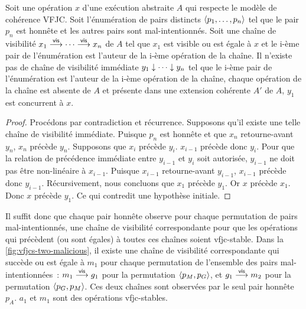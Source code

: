 \begin{proposition}
Soit une opération $x$ d'une exécution abstraite $A$ qui respecte le modèle de cohérence \ac{VFJC}.
Soit l'énumération de pairs distincts $\tuple*{p_1, \dotsc ,p_n}$ tel que le pair $p_n$ est honnête et les autres pairs sont mal-intentionnés.
Soit une chaîne de visibilité $x_1 \vis \dotsb \vis x_n$ de $A$ tel que $x_1$ est visible ou est égale à $x$ et le i-ème pair de l'énumération est l'auteur de la i-ème opération de la chaîne.
Il n'existe pas de chaîne de visibilité immédiate $y_1 \idr \dotsb \idr y_n$ tel que le i-ème pair de l'énumération est l'auteur de la i-ème opération de la chaîne, chaque opération de la chaîne est absente de $A$ et présente dans une extension cohérente $A'$ de $A$, $y_1$ est concurrent à $x$.
\end{proposition}

\begin{proof}
Procédons par contradiction et récurrence.
Supposons qu'il existe une telle chaîne de visibilité immédiate.
Puisque $p_n$ est honnête et que $x_n$ retourne-avant $y_n$, $x_n$ précède $y_n$.
Supposons que $x_i$ précède $y_i$.
$x_{i-1}$ précède donc $y_i$.
Pour que la relation de précédence immédiate entre $y_{i-1}$ et $y_i$ soit autorisée, $y_{i-1}$ ne doit pas être non-linéaire à $x_{i-1}$.
Puisque $x_{i-1}$ retourne-avant $y_{i-1}$, $x_{i-1}$ précède donc $y_{i-1}$.
Récursivement, nous concluons que $x_1$ précède $y_1$.
Or $x$ précède $x_1$.
Donc $x$ précède $y_1$.
Ce qui contredit une hypothèse initiale.
\end{proof}

Il suffit donc que chaque pair honnête observe pour chaque permutation de pairs mal-intentionnés, une chaîne de visibilité correspondante pour que les opérations qui précèdent (ou sont égales) à toutes ces chaînes soient vfjc-stable.
Dans la \autoref{fig:vfjcs-two-malicious}, il existe une chaîne de visibilité correspondante qui succède ou est égale à $m_1$ pour chaque permutation de l'ensemble des pairs mal-intentionnées~: $m_1 \vis g_1$ pour la permutation $\tuple*{p_M, p_G}$, et $g_1 \vis m_2$ pour la permutation $\tuple*{p_G, p_M}$.
Ces deux chaînes sont observées par le seul pair honnête $p_A$.
$a_1$ et $m_1$ sont des opérations vfjc-stables.

